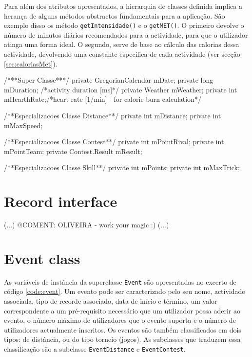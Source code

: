 \documentclass[a4paper,10pt]{report}
\begin{document}
Para além dos atributos apresentados, a hierarquia de classes definida implica a herança de alguns métodos abstractos fundamentais para a aplicação.
São exemplo disso os método \verb!getIntensidade()! e o \verb!getMET()!.
O primeiro devolve o número de minutos diários recomendados para a actividade, para que o utilizador atinga uma forma ideal. 
O segundo, serve de base ao cálculo das calorias dessa actividade, devolvendo uma constante específica de cada actividade (ver secção \ref{sec:caloriasMet}).

\begin{code}[caption=Variáveis de instância da superclasse Activity e subclasses respectivas (src/model/activity)., label=code:activity]
/***Super Classe***/
private GregorianCalendar mDate;
private long mDuration; /*activity duration [ms]*/
private Weather mWeather;
private int mHearthRate;/*heart rate [1/min] - for calorie burn calculation*/

/**Especializacoes Classe Distance**/
private int mDistance;
private int mMaxSpeed;

/**Especializacoes Classe Contest**/
private int mPointRival;
private int mPointTeam;
private Contest.Result mResult;

/**Especializacoes Classe Skill**/
private int mPoints;
private int mMaxTrick;
\end{code}

\section{Record interface}
\label{sec:interface}
(...)
@COMENT: OLIVEIRA - work your magic :)
(...)

\section{Event class}
\label{sec:event}
As variáveis de instância da superclasse \verb!Event! são apresentadas no excerto de código \ref{code:event}.
Um evento pode ser caracterizado pelo seu nome, actividade associada, tipo de recorde associado, 
data de início e término, um valor correspondente a um pré-requisito necessário que um utilizador possa aderir ao evento, 
o número máximo de utilizadores que o evento suporta e o número de utilizadores actualmente inscritos.
Os eventos são também classificados em dois tipos: de distância, ou do tipo torneio (jogos).
As subclasses que traduzem essa classificação são a subclasse \verb!EventDistance! e \verb!EventContest!.
\end{document}
